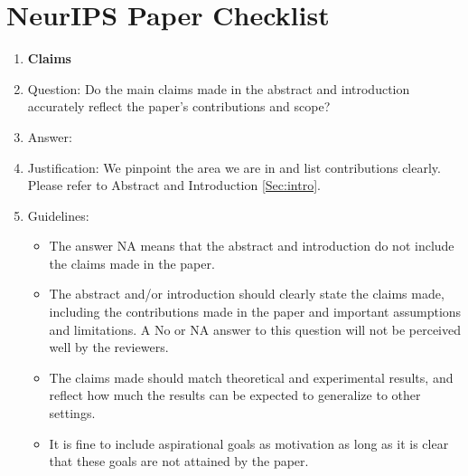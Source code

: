 \documentclass{article}
\begin{document}

\newpage
\section*{NeurIPS Paper Checklist}

\begin{enumerate}

\item {\bf Claims}
    \item[] Question: Do the main claims made in the abstract and introduction accurately reflect the paper's contributions and scope?
    \item[] Answer: \answerYes{} %
    \item[] Justification: We pinpoint the area we are in and list contributions clearly. Please refer to Abstract and Introduction \ref{Sec:intro}.
    \item[] Guidelines:
    \begin{itemize}
        \item The answer NA means that the abstract and introduction do not include the claims made in the paper.
        \item The abstract and/or introduction should clearly state the claims made, including the contributions made in the paper and important assumptions and limitations. A No or NA answer to this question will not be perceived well by the reviewers. 
        \item The claims made should match theoretical and experimental results, and reflect how much the results can be expected to generalize to other settings. 
        \item It is fine to include aspirational goals as motivation as long as it is clear that these goals are not attained by the paper. 
    \end{itemize}


\end{enumerate}
\end{document}
